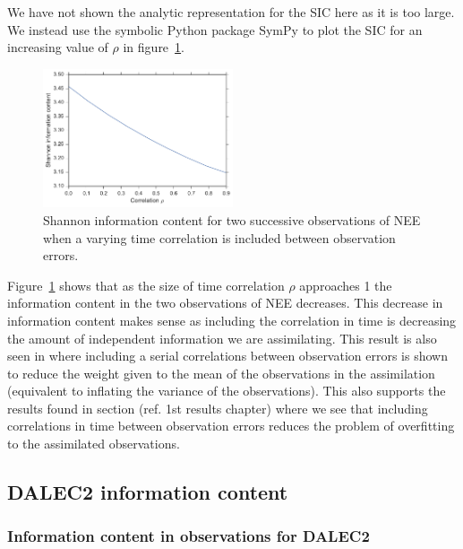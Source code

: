\documentclass[11pt]{article}
\begin{document}
We have not shown the analytic representation for the SIC here as it is too large. We instead use the symbolic Python package SymPy \citep{Joyner:2012:OSC:2110170.2110185} to plot the SIC for an increasing value of \(\rho\) in figure~\ref{fig:sic_corr_D1}.
\begin{figure}[ht]
	\centering
        \includegraphics[width=0.5\textwidth]{sic_corr_D1_nee.pdf}
    \caption{Shannon information content for two successive observations of NEE when a varying time correlation is included between observation errors.}
    \label{fig:sic_corr_D1}
\end{figure}
Figure~\ref{fig:sic_corr_D1} shows that as the size of time correlation \(\rho\) approaches 1 the information content in the two observations of NEE decreases. This decrease in information content makes sense as including the correlation in time is decreasing the amount of independent information we are assimilating. This result is also seen in \citet{jarvinen1999variational} where including a serial correlations between observation errors is shown to reduce the weight given to the mean of the observations in the assimilation (equivalent to inflating the variance of the observations). This also supports the results found in section ({\color{red}ref. 1st results chapter}) where we see that including correlations in time between observation errors reduces the problem of overfitting to the assimilated observations.


\subsection{DALEC2 information content} \label{sec:D2_IC}%
\subsubsection{Information content in observations for DALEC2}
\end{document}
